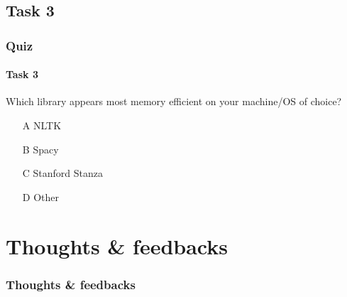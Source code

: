 \documentclass{beamer}
\begin{document}
\subsection{Task 3}
\begin{frame}
    \frametitle{Quiz}
    \framesubtitle{Task 3}
    Which library appears most memory efficient on your machine/OS of choice?
    \begin{enumerate}
        \item[A] NLTK
        \item[B] Spacy
        \item[C] Stanford Stanza
        \item[D] Other
    \end{enumerate}
\end{frame}

\section{Thoughts \& feedbacks}
\begin{frame}
    \frametitle{Thoughts \& feedbacks}
\end{frame}
\end{document}
